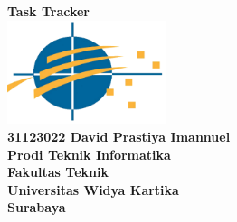 \documentclass[a4paper,12pt]{article}
\begin{document}
\vspace*{2cm}

\begin{center}
    {\LARGE \textbf{Task Tracker}}\\[1.5em]
    \includegraphics[width=0.35\textwidth]{assets/uwika_logo.png}\\[2em]
    {\Large \textbf{31123022 David Prastiya Imannuel}}\\[1.5em]
    {\Large \textbf{Prodi Teknik Informatika}}\\[1.5em]
    {\Large \textbf{Fakultas Teknik}}\\[1.5em]
    {\Large \textbf{Universitas Widya Kartika}}\\[1.5em]
    {\Large \textbf{Surabaya}}
\end{center}

\pagebreak


\end{document}
